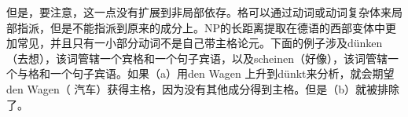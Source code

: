 但是，要注意，这一点没有扩展到非局部依存。格可以通过动词或动词复杂体来局部指派，但是不能指派到原来的成分上。NP的长距离提取在德语的西部变体中更加常见，并且只有一小部分动词不是自己带主格论元。下面的例子涉及dünken（去想），该词管辖一个宾格和一个句子宾语，以及scheinen（好像），该词管辖一个与格和一个句子宾语。如果（a）用den Wagen 上升到dünkt来分析，就会期望den Wagen（ 汽车）获得主格，因为没有其他成分得到主格。但是（b）就被排除了。

\eal
{}
\zl

